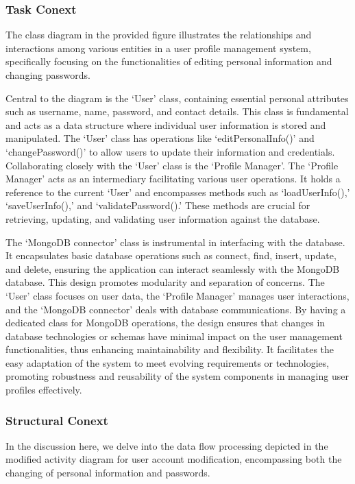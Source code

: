 \documentclass[conference]{IEEEtran}
\begin{document}
\subsubsection{\textbf{Task Conext }}
\textbf{ }

The class diagram in the provided figure illustrates the relationships and interactions among various entities in a user profile management system, specifically focusing on the functionalities of editing personal information and changing passwords.

Central to the diagram is the ‘User’ class, containing essential personal attributes such as username, name, password, and contact details. This class is fundamental and acts as a data structure where individual user information is stored and manipulated. The ‘User’ class has operations like ‘editPersonalInfo()’ and ‘changePassword()’ to allow users to update their information and credentials.
Collaborating closely with the ‘User’ class is the ‘Profile Manager’. The ‘Profile Manager’ acts as an intermediary facilitating various user operations. It holds a reference to the current ‘User’ and encompasses methods such as ‘loadUserInfo(),’ ‘saveUserInfo(),’ and ‘validatePassword().’ These methods are crucial for retrieving, updating, and validating user information against the database.

The ‘MongoDB connector’ class is instrumental in interfacing with the database. It encapsulates basic database operations such as connect, find, insert, update, and delete, ensuring the application can interact seamlessly with the MongoDB database.
This design promotes modularity and separation of concerns. The ‘User’ class focuses on user data, the ‘Profile Manager’ manages user interactions, and the ‘MongoDB connector’ deals with database communications. By having a dedicated class for MongoDB operations, the design ensures that changes in database technologies or schemas have minimal impact on the user management functionalities, thus enhancing maintainability and flexibility. It facilitates the easy adaptation of the system to meet evolving requirements or technologies, promoting robustness and reusability of the system components in managing user profiles effectively.

\subsubsection{\textbf{Structural Conext }}
\textbf{ }

In the discussion here, we delve into the data flow processing depicted in the modified activity diagram for user account modification, encompassing both the changing of personal information and passwords.
\end{document}
